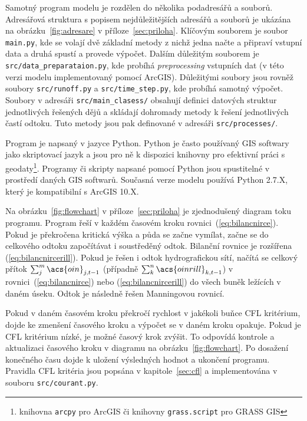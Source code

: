 Samotný program modelu \smod je rozdělen do několika podadresářů a souborů. Adresářová struktura s popisem nejdůležitějších adresářů a souborů je ukázána na obrázku~\ref{fig:adresare} v příloze~\ref{sec:priloha}. Klíčovým souborem  je  soubor {\tt main.py}, kde se volají dvě základní metody z nichž jedna načte a připraví vstupní data a druhá spustí a provede výpočet.  Dalším důležitým souborem je {\tt src/data\_preparataion.py}, kde probíhá  {\it preprocessing} vstupních dat (v této verzi modelu implementovaný pomocí ArcGIS). Důležitými soubory jsou rovněž soubory {\tt src/runoff.py} a {\tt src/time\_step.py}, kde probíhá samotný výpočet. Soubory v adresáři {\tt src/main\_clasess/} obsahují definici datových struktur jednotlivých řešených dějů a skládají dohromady metody k řešení jednotlivých častí odtoku. Tuto metody jsou pak definované v adresáři {\tt src/processes/}. 

Program \smod je napsaný v jazyce Python. Python je často používaný GIS softwary jako skriptovací jazyk a jsou pro ně k dispozici knihovny pro efektivní práci s geodaty\footnote{knihovna {\tt arcpy} pro ArcGIS či knihovny {\tt grass.script} pro GRASS GIS}. Programy či skripty napsané pomocí Python jsou spustitelné v prostředí daných GIS softwarů. Současná verze modelu \smod používá Python 2.7.X, který je kompatibilní s ArcGIS 10.X.

Na obrázku~\ref{fig:flowchart} v příloze~\ref{sec:priloha} je zjednodušený diagram toku programu. Program řeší v každém časovém kroku rovnici~(\ref{eq:bilancnirce}). Pokud je překročena kritická výška a půda se začne vymílat, začne se do celkového  odtoku  započítávat i soustředěný odtok. Bilanční rovnice je rozšířena (\ref{eq:bilancnircerill}). Pokud je řešen i odtok hydrografickou sítí, načítá se celkový přítok $\sum_j^m \acs{oin}_{j,t-1}$ (případně $\sum_k^n \acs{oinrill}_{k,t-1}$) v rovnici~(\ref{eq:bilancnirce})  nebo (\ref{eq:bilancnircerill}) do všech buněk ležících v daném úseku. Odtok je následně řešen Manningovou rovnicí.

Pokud v daném časovém kroku překročí rychlost v jakékoli buňce \acs{CFL} kritérium, dojde ke zmenšení časového kroku a výpočet se v daném kroku opakuje. Pokud je \acs{CFL} kritérium nízké, je možné časový krok zvýšit. To odpovídá kontrole a aktualizaci časového kroku v diagramu na obrázku~\ref{fig:flowchart}. Po dosažení konečného času dojde k uložení výsledných hodnot a ukončení programu. Pravidla \acs{CFL} kritéria jsou popsána v kapitole~\ref{sec:cfl} a implementována v souboru {\tt src/courant.py}.






